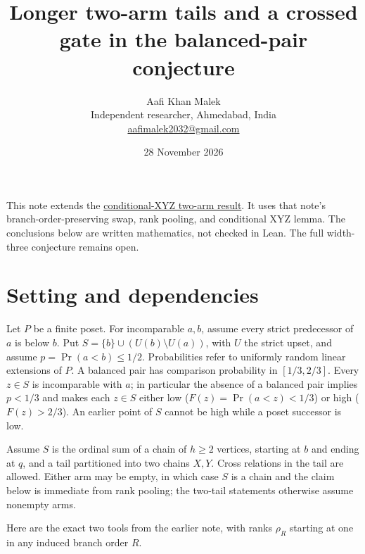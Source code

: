 \documentclass[10pt,letterpaper]{article}
\title{Longer two-arm tails and a crossed gate in the balanced-pair conjecture}
\author{Aafi Khan Malek\\ \small Independent researcher, Ahmedabad, India\\
\small\href{mailto:aafimalek2032@gmail.com}{aafimalek2032@gmail.com}}
\date{28 November 2026}
\begin{document}
\maketitle
This note extends the
\href{https://github.com/Aafimalek/novel-discoveries/blob/74189b99881fcf25b419b6f8042a62367e28f512/width-three-posets/verification/conditional-xyz-two-arm/notes.md}{conditional-XYZ
two-arm result}. It uses that note's branch-order-preserving swap, rank
pooling, and conditional XYZ lemma. The conclusions below are written
mathematics, not checked in Lean. The full width-three conjecture
remains open.

\section{Setting and dependencies}\label{setting-and-dependencies}

Let \(P\) be a finite poset. For incomparable \(a,b\), assume every
strict predecessor of \(a\) is below \(b\). Put
\(S=\{b\}\cup(U(b)\setminus U(a))\), with \(U\) the strict upset, and
assume \(p=\Pr(a<b)\le1/2\). Probabilities refer to uniformly random
linear extensions of \(P\). A balanced pair has comparison probability
in \([1/3,2/3]\). Every \(z\in S\) is incomparable with \(a\); in
particular the absence of a balanced pair implies \(p<1/3\) and makes
each \(z\in S\) either low (\(F(z)=\Pr(a<z)<1/3\)) or high
(\(F(z)>2/3\)). An earlier point of \(S\) cannot be high while a poset
successor is low.

Assume \(S\) is the ordinal sum of a chain of \(h\ge2\) vertices,
starting at \(b\) and ending at \(q\), and a tail partitioned into two
chains \(X,Y\). Cross relations in the tail are allowed. Either arm may
be empty, in which case \(S\) is a chain and the claim below is
immediate from rank pooling; the two-tail statements otherwise assume
nonempty arms.

Here are the exact two tools from the earlier note, with ranks
\(\rho_R\) starting at one in any induced branch order \(R\).
\end{document}
